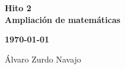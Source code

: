\begin{center}
\vspace*{3cm} %
{\huge \textbf{Hito 2}}\\
\vspace{0.75cm}
\textbf{Ampliación de matemáticas} \\
\begin{center}
    \large{\textbf{\today}} \\
\end{center}

\vspace{5cm} %

\begin{center}
        \large{Álvaro Zurdo Navajo}
\end{center}

\end{center}